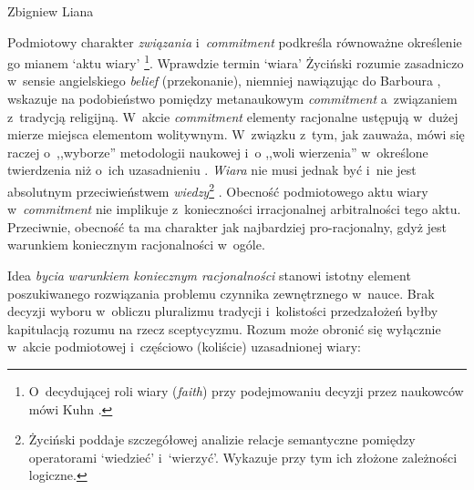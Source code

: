 \begin{artplenv}{Zbigniew Liana}


Podmiotowy charakter \textit{związania} i~\textit{commitment} podkreśla równoważne określenie go mianem ‘aktu wiary'
\parencite[][s.~186]{zycinski_teizm_1985}%
\footnote{O~decydującej roli wiary (\textit{faith}) przy podejmowaniu decyzji przez naukowców mówi Kuhn 
\parencites*[][s.~158]{kuhn_structure_1970_liana}[zob.][s.~274]{kuhn_struktura_2001}.%
}. Wprawdzie termin ‘wiara' Życiński rozumie zasadniczo w~sensie angielskiego \textit{belief} (przekonanie), niemniej nawiązując do Barboura 
\parencite*[][]{barbour_mity_1984}, %
 wskazuje na podobieństwo pomiędzy metanaukowym \textit{commitment} a~związaniem z~tradycją religijną. W~akcie \textit{commitment} elementy racjonalne ustępują w~dużej mierze miejsca elementom wolitywnym. W~związku z~tym, jak zauważa, mówi się raczej o~,,wyborze'' metodologii naukowej i~o ,,woli wierzenia'' w~określone twierdzenia niż o~ich uzasadnieniu 
\parencite[][s.~164]{zycinski_teizm_1985}. %
 \textit{Wiara} nie musi jednak być i~nie jest absolutnym przeciwieństwem \textit{wiedzy}\footnote{Życiński 
\parencite*[][s.~141–156]{zycinski_teizm_1985} %
 poddaje szczegółowej analizie relacje semantyczne pomiędzy operatorami ‘wiedzieć' i~‘wierzyć'. Wykazuje przy tym ich złożone zależności logiczne.} . Obecność podmiotowego aktu wiary w~\textit{commitment} nie implikuje z~konieczności irracjonalnej arbitralności tego aktu. Przeciwnie, obecność ta ma charakter jak najbardziej pro-racjonalny, gdyż jest warunkiem koniecznym racjonalności w~ogóle.

Idea \textit{bycia warunkiem koniecznym racjonalności} stanowi istotny element poszukiwanego rozwiązania problemu czynnika zewnętrznego w~nauce. Brak decyzji wyboru w~obliczu pluralizmu tradycji i~kolistości przedzałożeń byłby kapitulacją rozumu na rzecz sceptycyzmu. Rozum może obronić się wyłącznie w~akcie podmiotowej i~częściowo (koliście) uzasadnionej wiary:


\end{artplenv}
